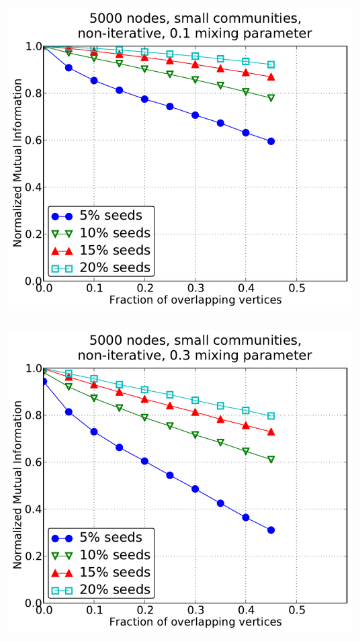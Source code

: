 %
\begin{figure}[h!]
    \centering
    \begin{subfigure}{0.5\textwidth}
    \centering
    \includegraphics[width=\appplotwidth]{plots/overlap_noniter_1mu_c.pdf}
    \end{subfigure}%
    \begin{subfigure}{0.5\textwidth}
    \centering
    \includegraphics[width=\appplotwidth]{plots/overlap_noniter_3mu_c.pdf}

\end{subfigure}
\end{figure}
